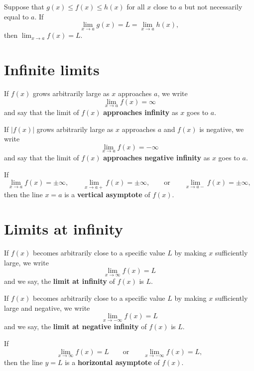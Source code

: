 \documentclass{ximera}
\begin{document}
\begin{theorem}
Suppose that $g(x) \le f(x) \le h(x)$ for all $x$
close to $a$ but not necessarily equal to $a$. If 
\[
\lim_{x\to a} g(x) = L = \lim_{x\to a} h(x),
\] 
then $\lim_{x\to a} f(x) = L$.
\end{theorem}


\section*{Infinite limits}

\begin{definition}
If $f(x)$ grows arbitrarily large as $x$ approaches $a$, we write
\[
\lim_{x\to a} f(x) = \infty
\]
and say that the limit of $f(x)$ \textbf{approaches infinity} as $x$
goes to $a$.

If $|f(x)|$ grows arbitrarily large as $x$ approaches $a$ and $f(x)$ is
negative, we write
\[
\lim_{x\to a} f(x) = -\infty
\]
and say that the limit of $f(x)$ \textbf{approaches negative infinity}
as $x$ goes to $a$.
\end{definition}



\begin{definition}
If 
\[
\lim_{x\to a} f(x) = \pm\infty, \qquad \lim_{x\to a+} f(x) = \pm\infty, \qquad\text{or}\qquad \lim_{x\to a-} f(x) = \pm\infty,
\]
then the line $x=a$ is a \textbf{vertical asymptote} of $f(x)$.
\end{definition}


\section*{Limits at infinity}



\begin{definition}
If $f(x)$ becomes arbitrarily close to a specific value $L$ by making
$x$ sufficiently large, we write
\[
\lim_{x\to \infty} f(x) = L
\]
and we say, the \textbf{limit at infinity} of $f(x)$ is $L$.  

If $f(x)$ becomes
arbitrarily close to a specific value $L$ by making $x$ sufficiently
large and negative, we write
\[
\lim_{x\to -\infty} f(x) = L
\]
and we say, the \textbf{limit at negative infinity} of $f(x)$ is $L$.  
\end{definition}



\begin{definition}
If  
\[
\lim_{x\to \infty} f(x) = L \qquad\text{or}\qquad \lim_{x\to -\infty} f(x) = L,
\]
then the line $y=L$ is a \textbf{horizontal asymptote} of $f(x)$.
\end{definition}
\end{document}
